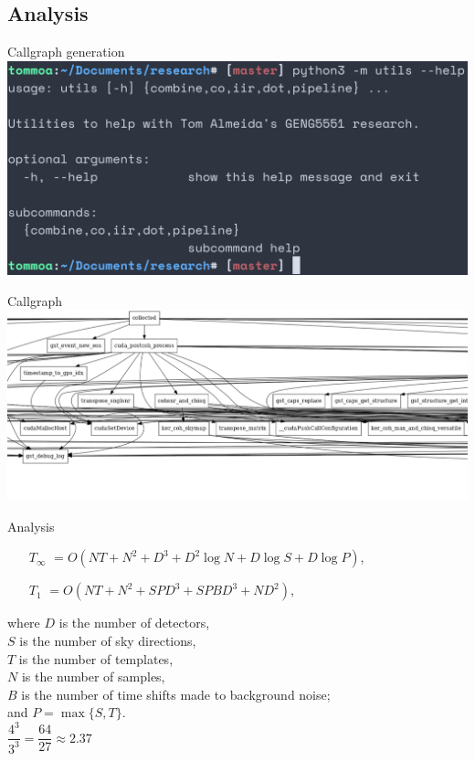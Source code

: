 \documentclass{beamer}
\begin{document}
\subsection{Analysis}

\begin{frame}{Callgraph generation}
    \centering
    \includegraphics[width=\textwidth]{../progress-report/utils.png}
\end{frame}

\begin{frame}{Callgraph}
    \centering
    \includegraphics[width=\textwidth]{../progress-report/callgraph.png}
\end{frame}

\begin{frame}{Analysis}
    \begin{itemize}
        \item[\(T_\infty\)] \(= O(NT + N^2 + D^3 + D^2 \log N + D \log S + D \log P)\),
        \item[\(T_1\)] \(= O(NT + N^2 + SPD^3 + SPBD^3 + ND^2)\),
    \end{itemize}
    where \(D\) is the number of detectors,\\
    \(S\) is the number of sky directions,\\
    \(T\) is the number of templates,\\
    \(N\) is the number of samples,\\
    \(B\) is the number of time shifts made to background noise;\\
    and \(P = \max\{S, T\}\).\\
    \centering
    \pause{} \(\dfrac{4^3}{3^3} = \dfrac{64}{27} \approx{} 2.37\)
\end{frame}
\end{document}
